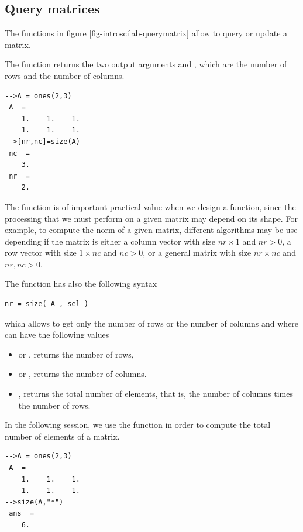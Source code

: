 \subsection{Query matrices}

The functions in figure \ref{fig-introscilab-querymatrix} allow 
to query or update a matrix.

The  function returns the two output arguments 
and , which are the number of rows and the number of columns.

\lstset{language=scilabscript}
\begin{lstlisting}
-->A = ones(2,3)
 A  =
    1.    1.    1.  
    1.    1.    1.  
-->[nr,nc]=size(A)
 nc  =
    3.  
 nr  =
    2.  
\end{lstlisting}

The  function is of important practical value when we 
design a function, since the processing 
that we must perform on a given matrix may depend on its shape.
For example, to compute the norm of a given matrix, different algorithms 
may be use depending if the matrix is either a column vector with size $nr\times 1$
and $nr>0$, a row vector with size $1\times nc$ and $nc>0$, or a general matrix 
with size $nr\times nc$ and $nr,nc>0$.

The  function has also the following syntax
\lstset{language=scilabscript}
\begin{lstlisting}
nr = size( A , sel )
\end{lstlisting}
which allows to get only the number of rows or the number of columns and 
where  can have the following values
\begin{itemize}
\item {} or , returns the number of rows,
\item {} or , returns the number of columns.
\item {}, returns the total number of elements, that is, the 
number of columns times the number of rows.
\end{itemize}

In the following session, we use the  function in order to 
compute the total number of elements of a matrix.
\lstset{language=scilabscript}
\begin{lstlisting}
-->A = ones(2,3)
 A  =
    1.    1.    1.  
    1.    1.    1.  
-->size(A,"*")
 ans  =
    6.  
\end{lstlisting}

